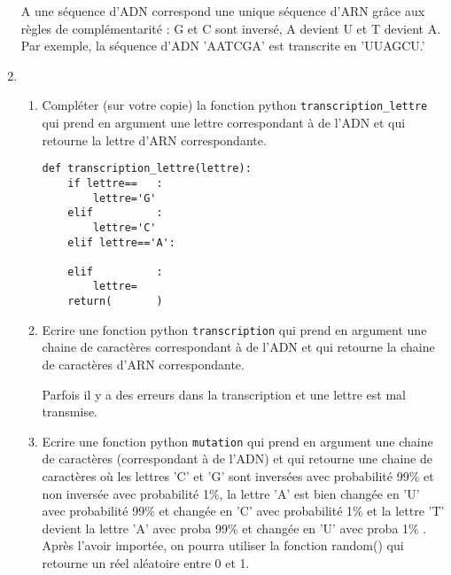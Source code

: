 \documentclass[a4paper, 11pt,reqno]{article}
\begin{document}
\begin{exercice}[Informatique]
\begin{enumerate}
A une séquence d’ADN  correspond une unique séquence d’ARN grâce aux règles de complémentarité : G  et   C sont inversé, A devient U et T devient A. Par exemple, la séquence d’ADN 'AATCGA' est transcrite en 'UUAGCU.' 
\item 
\begin{enumerate}

\item Compléter (sur votre copie)  la fonction python  \texttt{transcription\_lettre} qui prend en argument une lettre correspondant à de l'ADN et qui retourne la lettre d'ARN correspondante. 
\begin{lstlisting}
def transcription_lettre(lettre):
	if lettre==   :
		lettre='G'
	elif          :
		lettre='C'
	elif lettre=='A':
	
	elif          :
		lettre=
    return(       )
\end{lstlisting}

\item Ecrire une fonction python \texttt{transcription} qui prend en argument une chaine de caractères correspondant à de l'ADN et qui retourne la chaine de caractères d'ARN correspondante. 


Parfois il y  a  des erreurs dans la transcription et une lettre est mal transmise. 

\item Ecrire une fonction python \texttt{mutation} qui prend en argument une chaine de caractères (correspondant à de l'ADN) et qui retourne une  chaine de caractères où les lettres 'C' et 'G' sont inversées avec probabilité  99\% et non inversée avec probabilité 1\%, la lettre 'A' est bien changée en 'U' avec probabilité 99\% et changée en 'C' avec probabilité 1\% et la lettre 'T' devient la  lettre 'A' avec proba 99\% et changée en 'U' avec proba 1\%  . Après l'avoir importée, on pourra utiliser la fonction random() qui retourne un réel aléatoire entre 0 et 1. 

\end{enumerate}

\end{enumerate}


\end{exercice}



%
\end{document}
